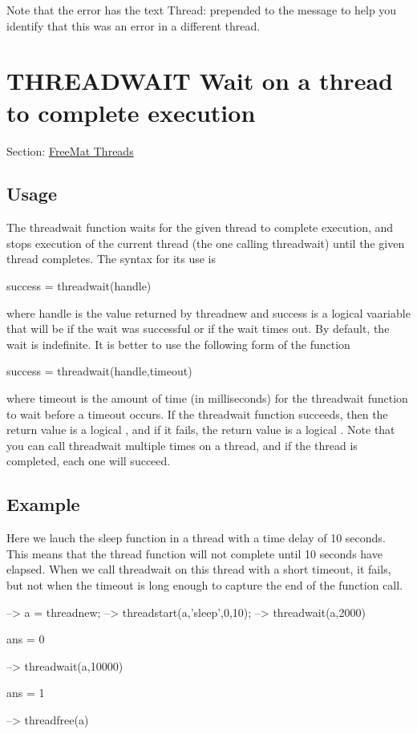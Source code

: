 Note that the error has the text {\ttfamily Thread\-:} prepended to the message to help you identify that this was an error in a different thread. \hypertarget{thread_threadwait}{}\section{T\-H\-R\-E\-A\-D\-W\-A\-I\-T Wait on a thread to complete execution}\label{thread_threadwait}
Section\-: \hyperlink{sec_thread}{Free\-Mat Threads} \hypertarget{vtkwidgets_vtkxyplotwidget_Usage}{}\subsection{Usage}\label{vtkwidgets_vtkxyplotwidget_Usage}
The {\ttfamily threadwait} function waits for the given thread to complete execution, and stops execution of the current thread (the one calling {\ttfamily threadwait}) until the given thread completes. The syntax for its use is \begin{DoxyVerb}   success = threadwait(handle)
\end{DoxyVerb}
 where {\ttfamily handle} is the value returned by {\ttfamily threadnew} and {\ttfamily success} is a {\ttfamily logical} vaariable that will be {} if the wait was successful or {} if the wait times out. By default, the wait is indefinite. It is better to use the following form of the function \begin{DoxyVerb}   success = threadwait(handle,timeout)
\end{DoxyVerb}
 where {\ttfamily timeout} is the amount of time (in milliseconds) for the {\ttfamily threadwait} function to wait before a timeout occurs. If the {\ttfamily threadwait} function succeeds, then the return value is a logical {}, and if it fails, the return value is a logical {}. Note that you can call {\ttfamily threadwait} multiple times on a thread, and if the thread is completed, each one will succeed. \hypertarget{variables_struct_Example}{}\subsection{Example}\label{variables_struct_Example}
Here we lauch the {\ttfamily sleep} function in a thread with a time delay of 10 seconds. This means that the thread function will not complete until 10 seconds have elapsed. When we call {\ttfamily threadwait} on this thread with a short timeout, it fails, but not when the timeout is long enough to capture the end of the function call.


\begin{DoxyVerbInclude}
--> a = threadnew;
--> threadstart(a,'sleep',0,10);  %
--> threadwait(a,2000)            %

ans = 
 0 

--> threadwait(a,10000)           %

ans = 
 1 

--> threadfree(a)
\end{DoxyVerbInclude}
 